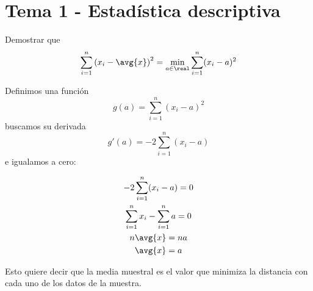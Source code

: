 %
%
%

\section{Tema 1 - Estadística descriptiva}

\begin{problem}[2] Demostrar que \[ \sum_{i=1}^n \left(x_i-\avg{x}\right)^2 = \min_{a\in \real} \sum_{i=1}^n(x_i-a)^2 \]

\solution

Definimos una función \[ g(a) = \sum_{i=1}^n(x_i-a)^2 \] buscamos su derivada \[ g'(a) = -2 \sum_{i=1}^n(x_i-a) \] e igualamos a cero:

\begin{gather*}
-2 \sum_{i=1}^n(x_i-a) = 0 \\
\sum_{i=1}^n x_i - \sum_{i=1}^n a = 0 \\
n \avg{x} = n a \\
\avg{x} = a 
\end{gather*}

Esto quiere decir que la media muestral es el valor que minimiza la distancia con cada uno de los datos de la muestra.
\end{problem}

